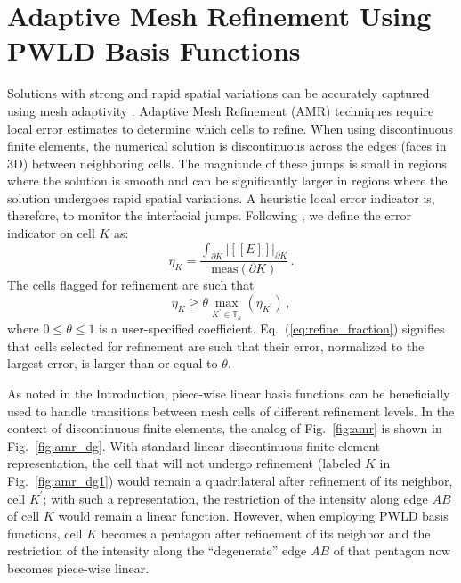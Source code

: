 \documentclass[preprint,10pt]{elsarticle}
\newcommand{\jmp}[1]{[\![#1]\!]}                     %
\newcommand{\eqt}[1]{Eq.~(\ref{#1})}                     %
\newcommand{\fig}[1]{Fig.~\ref{#1}}                      %
\begin{document}
\section{Adaptive Mesh Refinement Using PWLD Basis Functions} \label{sec:amr}

Solutions with strong and rapid spatial variations can be accurately captured using mesh adaptivity
\cite{Ainsworth1997}. Adaptive Mesh Refinement (AMR) techniques require local error estimates to determine
which cells to refine. When using discontinuous finite elements, the numerical solution is discontinuous
across the edges (faces in 3D) between neighboring cells. The magnitude of these jumps is 
small in regions where the solution is smooth and can be significantly larger in regions where
the solution undergoes rapid spatial variations. A heuristic local error indicator is, therefore, to
monitor the interfacial jumps. Following \cite{Leicht2008,Ragusa_Wang_JCP_2011}, we define 
the error indicator on cell $K$ as:
\begin{equation} \label{eq:error_indicator}
  \eta_K = \frac{\int_{\partial K} |\jmp{E}|_{\partial K}} {\text{meas}(\partial K)} \, .
\end{equation}  
%
The cells flagged for refinement are such that 
\begin{equation} \label{eq:refine_fraction}
  \eta_K \ge  \theta \max_{K^\prime \in \mathbb{T}_h} \left( \eta_{K^\prime} \right) \, ,
\end{equation}  
where $0 \le \theta \le 1$ is a user-specified coefficient. \eqt{eq:refine_fraction} signifies
that cells selected for refinement are such that their error, normalized to the largest error, 
is larger than or equal to $\theta$.

As noted in the Introduction, piece-wise linear basis functions can be beneficially used to handle transitions
between mesh cells of different refinement levels. In the context of discontinuous finite elements, the
analog of \fig{fig:amr} is shown in \fig{fig:amr_dg}. With standard linear discontinuous finite element representation, 
the cell that will not undergo refinement (labeled $K$ in \fig{fig:amr_dg1}) would remain a quadrilateral 
after refinement of its neighbor, cell $K^\prime$; with such a representation, the restriction of the intensity 
along edge $AB$ of cell $K$ would remain a linear function. However, when employing 
PWLD basis functions, cell $K$ becomes a pentagon after refinement of its neighbor and the 
restriction of the intensity along the ``degenerate'' edge $AB$ of that pentagon now becomes 
piece-wise linear.
\end{document}
